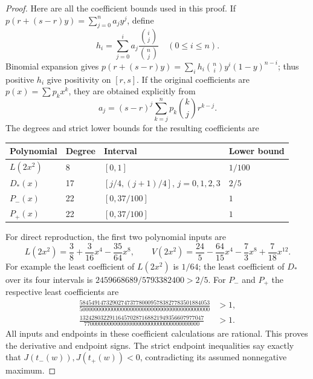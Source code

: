 \begin{proof}
Here are all the coefficient bounds used in this proof.  If
$p(r+(s-r)y)=\sum_{j=0}^n a_jy^j$, define
\[
 h_i=\sum_{j=0}^i a_j\frac{\binom{i}{j}}{\binom nj}
 \quad(0\le i\le n).
\]
Binomial expansion gives
$p(r+(s-r)y)=\sum_i h_i\binom ni y^i(1-y)^{n-i}$; thus positive $h_i$
give positivity on $[r,s]$.  If the original coefficients are
$p(x)=\sum p_kx^k$, they are obtained explicitly from
\[
 a_j=(s-r)^j\sum_{k=j}^n p_k\binom{k}{j}r^{k-j}.
\]
The degrees and strict lower bounds for the resulting coefficients are
\begin{center}
\begin{tabular}{@{}llll@{}}
\toprule
Polynomial & Degree & Interval & Lower bound\\
\midrule
$L(2x^2)$ &8&$[0,1]$&$1/100$\\
$D_*(x)$ &17&$[j/4,(j+1)/4]$, $j=0,1,2,3$&$2/5$\\
$P_-(x)$ &22&$[0,37/100]$&$1$\\
$P_+(x)$ &22&$[0,37/100]$&$1$\\
\bottomrule
\end{tabular}
\end{center}
For direct reproduction, the first two polynomial inputs are
\[
 L(2x^2)=\frac38+\frac3{16}x^4-\frac{35}{64}x^8,
 \qquad
 V(2x^2)=\frac{24}{5}-\frac{64}{15}x^4-\frac73x^8+\frac7{18}x^{12}.
\]
For example the least coefficient of $L(2x^2)$ is $1/64$; the least
coefficient of $D_*$ over its four intervals is
$2459668689/5793382400>2/5$.  For $P_-$ and $P_+$ the respective least
coefficients are
\[
 \begin{aligned}
 \frac{58454914732902747377800095783827783501884053}
      {50000000000000000000000000000000000000000000}&>1,\\
 \frac{132428032291164570287168821949356607977047}
      {770000000000000000000000000000000000000}&>1.
 \end{aligned}
\]
All inputs and endpoints in these coefficient calculations are rational.
This proves the derivative and endpoint signs.  The strict endpoint
inequalities say exactly that $J(t_-(w)),J(t_+(w))<0$, contradicting its
assumed nonnegative maximum.
\end{proof}

